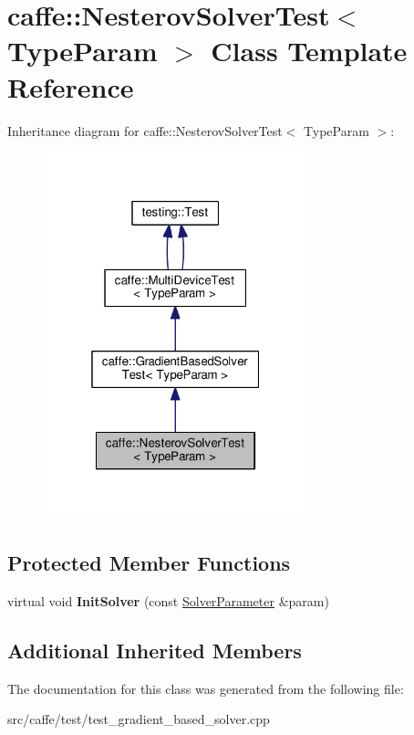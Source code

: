 \hypertarget{classcaffe_1_1_nesterov_solver_test}{}\section{caffe\+:\+:Nesterov\+Solver\+Test$<$ Type\+Param $>$ Class Template Reference}
\label{classcaffe_1_1_nesterov_solver_test}


Inheritance diagram for caffe\+:\+:Nesterov\+Solver\+Test$<$ Type\+Param $>$\+:
\nopagebreak
\begin{figure}[H]
\begin{center}
\leavevmode
\includegraphics[width=217pt]{classcaffe_1_1_nesterov_solver_test__inherit__graph}
\end{center}
\end{figure}
\subsection*{Protected Member Functions}
\begin{DoxyCompactItemize}
\item 
\mbox{\label{classcaffe_1_1_nesterov_solver_test_ac349bcb77572d84aa5b13eef9f95a171}} 
virtual void {\bfseries Init\+Solver} (const \mbox{\hyperlink{classcaffe_1_1_solver_parameter}{Solver\+Parameter}} \&param)
\end{DoxyCompactItemize}
\subsection*{Additional Inherited Members}


The documentation for this class was generated from the following file\+:\begin{DoxyCompactItemize}
\item 
src/caffe/test/test\+\_\+gradient\+\_\+based\+\_\+solver.\+cpp\end{DoxyCompactItemize}
